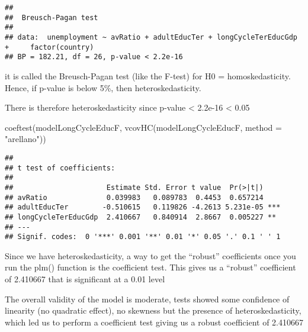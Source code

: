 \documentclass[
]{article}
\newenvironment{Shaded}{\begin{snugshade}}{\end{snugshade}}
\newcommand{\AttributeTok}[1]{\textcolor[rgb]{0.77,0.63,0.00}{#1}}
\newcommand{\FunctionTok}[1]{\textcolor[rgb]{0.00,0.00,0.00}{#1}}
\newcommand{\NormalTok}[1]{#1}
\newcommand{\StringTok}[1]{\textcolor[rgb]{0.31,0.60,0.02}{#1}}
\begin{document}
\begin{verbatim}
## 
##  Breusch-Pagan test
## 
## data:  unemployment ~ avRatio + adultEducTer + longCycleTerEducGdp +     factor(country)
## BP = 182.21, df = 26, p-value < 2.2e-16
\end{verbatim}

it is called the Breusch-Pagan test (like the F-test) for H0 =
homoskedasticity. Hence, if p-value is below 5\%, then
heteroskedasticity.

There is therefore heteroskedasticity since p-value \textless{} 2.2e-16
\textless{} 0.05

\begin{Shaded}
\begin{Highlighting}[]
\FunctionTok{coeftest}\NormalTok{(modelLongCycleEducF, }\FunctionTok{vcovHC}\NormalTok{(modelLongCycleEducF, }\AttributeTok{method =} \StringTok{"arellano"}\NormalTok{))}
\end{Highlighting}
\end{Shaded}

\begin{verbatim}
## 
## t test of coefficients:
## 
##                      Estimate Std. Error t value  Pr(>|t|)    
## avRatio              0.039983   0.089783  0.4453  0.657214    
## adultEducTer        -0.510615   0.119826 -4.2613 5.231e-05 ***
## longCycleTerEducGdp  2.410667   0.840914  2.8667  0.005227 ** 
## ---
## Signif. codes:  0 '***' 0.001 '**' 0.01 '*' 0.05 '.' 0.1 ' ' 1
\end{verbatim}

Since we have heteroskedasticity, a way to get the ``robust''
coefficients once you run the plm() function is the coefficient test.
This gives us a ``robust'' coefficient of 2.410667 that is significant
at a 0.01 level

The overall validity of the model is moderate, tests showed some
confidence of linearity (no quadratic effect), no skewness but the
presence of heteroskedasticity, which led us to perform a coefficient
test giving us a robust coefficient of 2.410667
\end{document}
